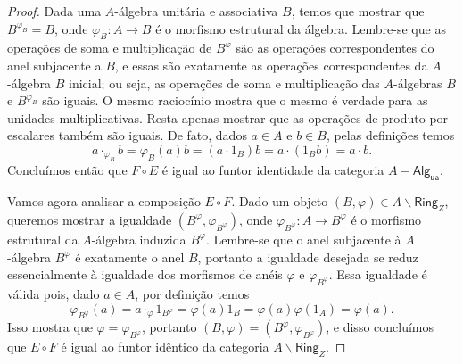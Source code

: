 \begin{proof}
  Dada uma $A$-álgebra unitária e associativa $B$, temos que mostrar que $B^{\varphi_{B}} = B$, onde $\varphi_{B}: A \to B$ é o morfismo estrutural da álgebra.
  Lembre-se que as operações de soma e multiplicação de $B^{\varphi}$ são as operações correspondentes do anel subjacente a $B$, e essas são exatamente as operações correspondentes da $A$-álgebra $B$ inicial; ou seja, as operações de soma e multiplicação das $A$-álgebras $B$ e $B^{\varphi_{B}}$ são iguais.
  O mesmo raciocínio mostra que o mesmo é verdade para as unidades multiplicativas.
  Resta apenas mostrar que as operações de produto por escalares também são iguais.
  De fato, dados $a \in A$ e $b \in B$, pelas definições temos
  \begin{displaymath}
    a \cdot_{\varphi_{B}} b = \varphi_{B}(a)b = (a \cdot 1_{B}) b = a \cdot (1_{B}b) = a \cdot b.
  \end{displaymath}
  Concluímos então que $F \circ E$ é igual ao funtor identidade da categoria $A-\mathsf{Alg_{ua}}$.

  Vamos agora analisar a composição $E \circ F$.
  Dado um objeto $(B,\varphi) \in A \backslash \mathsf{Ring}_{Z}$, queremos mostrar a igualdade $(B^{\varphi},\varphi_{B^{\varphi}})$, onde $\varphi_{B^{\varphi}}: A \to B^{\varphi}$ é o morfismo estrutural da $A$-álgebra induzida $B^{\varphi}$.
  Lembre-se que o anel subjacente à $A$-álgebra $B^{\varphi}$ é exatamente o anel $B$, portanto a igualdade desejada se reduz essencialmente à igualdade dos morfismos de anéis $\varphi$ e $\varphi_{B^{\varphi}}$.
  Essa igualdade é válida pois, dado $a \in A$, por definição temos
  \begin{displaymath}
    \varphi_{B^{\varphi}}(a) = a \cdot_{\varphi} 1_{B^{\varphi}} = \varphi(a)1_{B} = \varphi(a)\varphi(1_{A}) = \varphi(a).
  \end{displaymath}
  Isso mostra que $\varphi = \varphi_{B^{\varphi}}$, portanto $(B,\varphi) = (B^{\varphi},\varphi_{B^{\varphi}})$, e disso concluímos que $E \circ F$ é igual ao funtor idêntico da categoria $A \backslash \mathsf{Ring}_{Z}$.
\end{proof}

